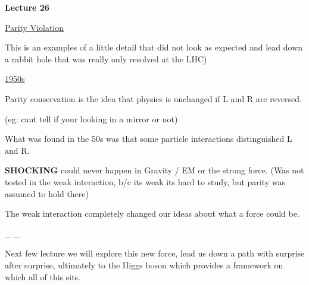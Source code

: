 
\usepackage{braket}
\usepackage{bbm}
\usepackage{relsize}
\usepackage{tcolorbox}




\usepackage{fancyhdr}

\fancyhf{}


\thispagestyle{fancy}

\begin{center}
{\huge \textbf{Lecture 26}}
\end{center}

{\fontsize{14}{16}\selectfont

\underline{\underline{Parity Violation}} 

This is an examples of a little detail that did not look as expected and lead down a rabbit hole  that was really only resolved at the LHC) 


\underline{1950s}

Parity conservation is the idea that physics is unchanged if L and R are reversed. 

(eg: cant tell if your looking in a mirror or not)

What was found in the 50s was that some particle interactions distinguished L and R. 

\textbf{SHOCKING} could never happen in Gravity / EM or the strong force. 
(Was not tested in the weak interaction, b/c its weak its hard to study, but parity was assumed to hold there)

The weak interaction completely changed our ideas about what a force could be.


\be
{}  \underbrace{\rightarrow}_{}  \underbrace{\rightarrow}_{} 
\ee


Next few lecture we will explore this new force, lead us down a path with surprise after surprise, ultimately to the Higgs boson which provides a framework on which all of this sits. 


\lineacross

\clearpage

}
